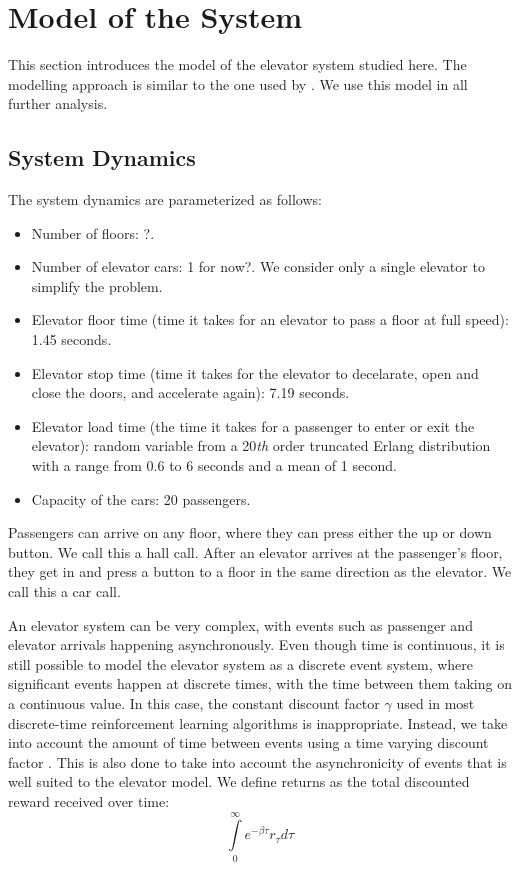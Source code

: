 \section{Model of the System}

This section introduces the model of the elevator system studied here. The modelling approach is similar to the one used by \cite{walczak2006, crites_barto_1998}. We use this model in all further analysis.

\subsection{System Dynamics}
The system dynamics are parameterized as follows:

\begin{itemize}
    \item Number of floors: ?.
    \item Number of elevator cars: 1 {\color{red}for now?}. We consider only a single elevator to simplify the problem.
    \item Elevator floor time (time it takes for an elevator to pass a floor at full speed): 1.45 seconds.
    \item Elevator stop time (time it takes for the elevator to decelarate, open and close the doors, and accelerate again): 7.19 seconds.
    \item Elevator load time (the time it takes for a passenger to enter or exit the elevator): random variable from a 20\textit{th} order truncated Erlang distribution with a range from 0.6 to 6 seconds and a mean of 1 second.
    \item Capacity of the cars: 20 passengers.
\end{itemize}

Passengers can arrive on any floor, where they can press either the up or down button. We call this a hall call. After an elevator arrives at the passenger's floor, they get in and press a button to a floor in the same direction as the elevator. We call this a car call.

An elevator system can be very complex, with events such as passenger and elevator arrivals happening asynchronously. Even though time is continuous, it is still possible to model the elevator system as a discrete event system, where significant events happen at discrete times, with the time between them taking on a continuous value. In this case, the constant discount factor $\gamma$ used in most discrete-time reinforcement learning algorithms is inappropriate. Instead, we take into account the amount of time between events using a time varying discount factor \cite{bradtke_94}. This is also done to take into account the asynchronicity of events that is well suited to the elevator model. We define returns as the total discounted reward received over time:
\begin{equation}
    \int\limits_0^{\infty} e^{-\beta \tau} r_{\tau} d\tau
\end{equation}


